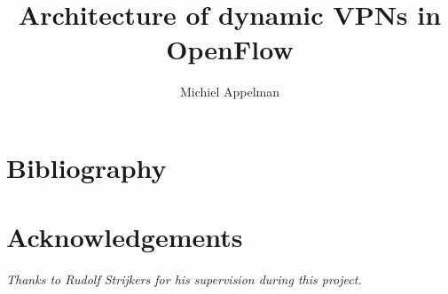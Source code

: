 \documentclass[oneside,8pt,a4paper]{article}
\title{Architecture of dynamic VPNs in OpenFlow}
\author{Michiel Appelman}
\begin{document}
	
	
	
	\clearpage

	\acresetall
	\setlength{\parskip}{0ex plus 0.5ex minus 0.2ex}
	
	\tableofcontents
	\clearpage

	\listoffigures
	\listoftables
	\clearpage
	
	\acresetall
		\setlength{\parskip}{1.3ex plus 0.2ex minus 0.2ex}
		\pagestyle{fancy}
		\renewcommand{\sectionmark}[1]{%
		\markboth{#1}{}}
		\fancyhead[L]{\small{\nouppercase{\leftmark}}}
		\fancyhead[R]{\nouppercase{\emph{\chaptername\ \LARGE{\thesection}}}}
		\renewcommand{\headrulewidth}{0.5pt}
		

		
		\clearpage
		
				
		\clearpage
		
				
		\clearpage
		
		
						
		\clearpage
		
						
		\clearpage
		
		\appendix
		\noappendicestocpagenum
		\addappheadtotoc
		\pagestyle{fancy}
		\renewcommand{\sectionmark}[1]{%
		\markboth{#1}{}}
		\fancyhead[L]{\small{\nouppercase{\leftmark}}}
		\fancyhead[R]{\nouppercase{\emph{\appendixname\ \LARGE{\thesection}}}}
		\renewcommand{\headrulewidth}{0.5pt}

		
		\clearpage

		\renewcommand*{\refname}{} %
		\section{Bibliography}
		
		

		\clearpage
		\pagestyle{empty}
		\vspace*{\fill}
		{\section*{Acknowledgements}
		\textsl{Thanks to Rudolf Strijkers for his supervision during this project.}}
		\vspace*{\fill}
\end{document}
